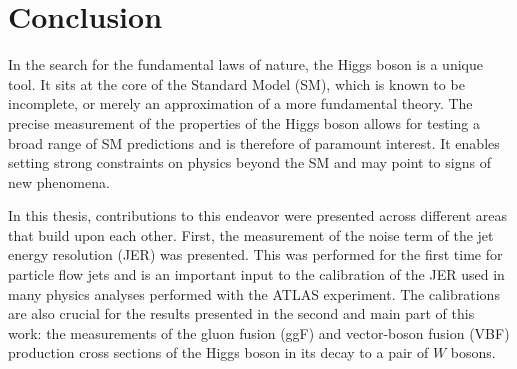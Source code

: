 \chapter{Conclusion}
\label{chap:conclusion}
In the search for the fundamental laws of nature, the Higgs boson is a unique tool. 
It sits at the core of the Standard Model (SM), which is known to be incomplete, or merely an approximation of a more fundamental theory. 
The precise measurement of the properties of the Higgs boson allows for testing a broad range of SM predictions and is therefore of paramount interest.
It enables setting strong constraints on physics beyond the SM and may point to signs of new phenomena. %

In this thesis, contributions to this endeavor were presented across different areas that build upon each other. 
First, the measurement of the noise term of the jet energy resolution (JER) was presented. 
This was performed for the first time for particle flow jets and is an important input to the calibration of the JER used in many physics analyses performed with the ATLAS experiment. 
The calibrations are also crucial for the results presented in the second and main part of this work: the measurements of the gluon fusion (ggF) and vector-boson fusion (VBF) production cross sections of the Higgs boson in its decay to a pair of $W$ bosons.

